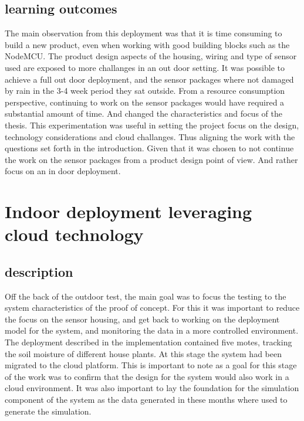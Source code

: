 \documentclass[]{uiophd}
\begin{document}
\subsection{learning outcomes}
The main observation from this deployment was that it is time consuming to build a new product, even when working with good building blocks such as the NodeMCU. The product design aspects of the housing, wiring and type of sensor used are exposed to more challanges in an out door setting. It was possible to achieve a full out door deployment, and the sensor packages where not damaged by rain in the 3-4 week period they sat outside. From a resource consumption perspective, continuing to work on the sensor packages would have required a substantial amount of time. And changed the characteristics and focus of the thesis. This experimentation was useful in setting the project focus on the design, technology considerations and cloud challanges. Thus aligning the work with the questions set forth in the introduction. Given that it was chosen to not continue the work on the sensor packages from a product design point of view. And rather focus on an in door deployment.

\section{Indoor deployment leveraging cloud technology}

\subsection{description}
Off the back of the outdoor test, the main goal was to focus the testing to the system characteristics of the proof of concept. For this it was important to reduce the focus on the sensor housing, and get back to working on the deployment model for the system, and monitoring the data in a more controlled environment. The deployment described in the implementation contained five motes, tracking the soil moisture of different house plants. At this stage the system had been migrated to the cloud platform. This is important to note as a goal for this stage of the work was to confirm that the design for the system would also work in a cloud environment. It was also important to lay the foundation for the simulation component of the system as the data generated in these months where used to generate the simulation.
\end{document}
